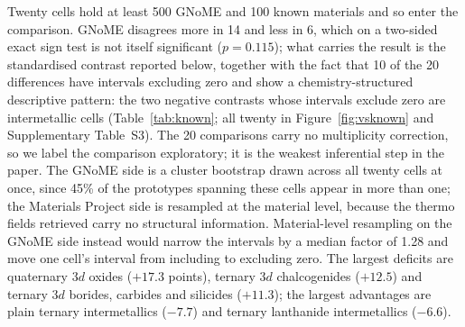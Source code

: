 \documentclass[11pt]{article}
\begin{document}
Twenty cells hold at least 500 GNoME and 100 known materials and so enter the
comparison. GNoME disagrees more in 14 and less in 6, which on a two-sided exact sign test is not
itself significant ($p=0.115$); what carries the result is the standardised contrast reported below, together with
the fact that 10 of the 20 differences have intervals excluding zero and show a
chemistry-structured descriptive pattern:
the two negative contrasts whose intervals exclude zero are intermetallic cells
(Table~\ref{tab:known}; all twenty in Figure~\ref{fig:vsknown} and
Supplementary Table~S3). The 20 comparisons carry no multiplicity correction, so we
label the comparison exploratory; it is the weakest inferential step in the paper. The
GNoME side is a cluster bootstrap drawn across all twenty cells at once, since 45\% of
the prototypes spanning these cells appear in more than one; the Materials Project side
is resampled at the material level, because the thermo fields retrieved carry no
structural information. Material-level resampling on the GNoME side instead would narrow
the intervals by a median factor of 1.28 and move one cell's interval from including
to excluding zero. The largest deficits are quaternary 3$d$
oxides ($+17.3$ points), ternary 3$d$ chalcogenides ($+12.5$) and ternary 3$d$ borides,
carbides and silicides ($+11.3$); the largest advantages are plain ternary
intermetallics ($-7.7$) and ternary lanthanide intermetallics ($-6.6$).
\end{document}
